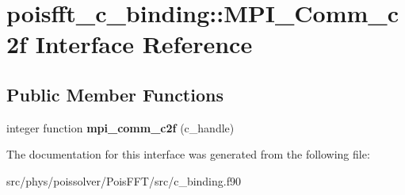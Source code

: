 \hypertarget{interfacepoisfft__c__binding_1_1MPI__Comm__c2f}{}\section{poisfft\+\_\+c\+\_\+binding\+:\+:M\+P\+I\+\_\+\+Comm\+\_\+c2f Interface Reference}
\label{interfacepoisfft__c__binding_1_1MPI__Comm__c2f}
\subsection*{Public Member Functions}
\begin{DoxyCompactItemize}
\item 
integer function {\bfseries mpi\+\_\+comm\+\_\+c2f} (c\+\_\+handle)\hypertarget{interfacepoisfft__c__binding_1_1MPI__Comm__c2f_a4e15ab083800eef4aa28a4b4316f358d}{}\label{interfacepoisfft__c__binding_1_1MPI__Comm__c2f_a4e15ab083800eef4aa28a4b4316f358d}

\end{DoxyCompactItemize}


The documentation for this interface was generated from the following file\+:\begin{DoxyCompactItemize}
\item 
src/phys/poissolver/\+Pois\+F\+F\+T/src/c\+\_\+binding.\+f90\end{DoxyCompactItemize}

